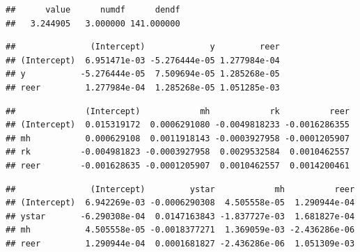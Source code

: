 \documentclass[]{article}
\newenvironment{Shaded}{\begin{snugshade}}{\end{snugshade}}
\newcommand{\OperatorTok}[1]{\textcolor[rgb]{0.81,0.36,0.00}{\textbf{#1}}}
\newcommand{\NormalTok}[1]{#1}
\begin{document}
\begin{Shaded}
\end{Shaded}

\begin{verbatim}
##      value      numdf      dendf 
##   3.244905   3.000000 141.000000
\end{verbatim}

\begin{Shaded}
\end{Shaded}

\begin{verbatim}
##               (Intercept)             y         reer
## (Intercept)  6.951471e-03 -5.276444e-05 1.277984e-04
## y           -5.276444e-05  7.509694e-05 1.285268e-05
## reer         1.277984e-04  1.285268e-05 1.051285e-03
\end{verbatim}

\begin{Shaded}
\end{Shaded}

\begin{verbatim}
##              (Intercept)            mh            rk          reer
## (Intercept)  0.015319172  0.0006291080 -0.0049818233 -0.0016286355
## mh           0.000629108  0.0011918143 -0.0003927958 -0.0001205907
## rk          -0.004981823 -0.0003927958  0.0029532584  0.0010462557
## reer        -0.001628635 -0.0001205907  0.0010462557  0.0014200461
\end{verbatim}

\begin{Shaded}
\end{Shaded}

\begin{verbatim}
##               (Intercept)         ystar            mh          reer
## (Intercept)  6.942269e-03 -0.0006290308  4.505558e-05  1.290944e-04
## ystar       -6.290308e-04  0.0147163843 -1.837727e-03  1.681827e-04
## mh           4.505558e-05 -0.0018377271  1.369059e-03 -2.436286e-06
## reer         1.290944e-04  0.0001681827 -2.436286e-06  1.051309e-03
\end{verbatim}
\end{document}
